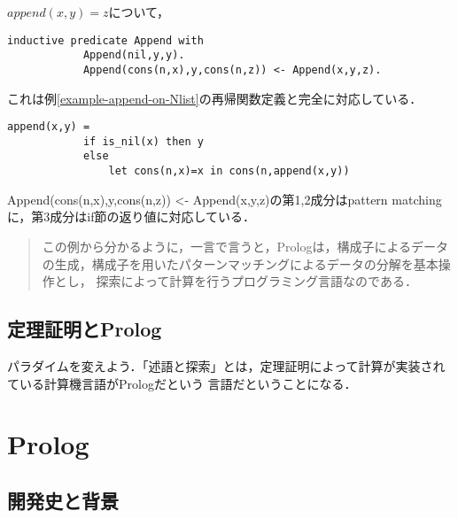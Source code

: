 \documentclass[uplatex, 12pt, dvipdfmx]{jsreport}
\begin{document}
\begin{example}[Append]$append(x,y)=z$について，
    \begin{lstlisting}[caption=Append]
        inductive predicate Append with
            Append(nil,y,y).
            Append(cons(n,x),y,cons(n,z)) <- Append(x,y,z).
    \end{lstlisting}
\end{example}
\begin{remark}
    これは例\ref{example-append-on-Nlist}の再帰関数定義と完全に対応している．
    \begin{lstlisting}[caption=append]
        append(x,y) =
            if is_nil(x) then y
            else
                let cons(n,x)=x in cons(n,append(x,y))
    \end{lstlisting}
    Append(cons(n,x),y,cons(n,z)) <- Append(x,y,z)の第1,2成分はpattern matchingに，第3成分はif節の返り値に対応している．
\end{remark}
\begin{quote}
    この例から分かるように，一言で言うと，Prologは，構成子によるデータの生成，構成子を用いたパターンマッチングによるデータの分解を基本操作とし，
    探索によって計算を行うプログラミング言語なのである\cite{関数プログラミング}．
\end{quote}

\subsection{定理証明とProlog}

パラダイムを変えよう．「述語と探索」とは，定理証明によって計算が実装されている計算機言語がPrologだという
言語だということになる．

\section{Prolog}

\subsection{開発史と背景}
\end{document}
